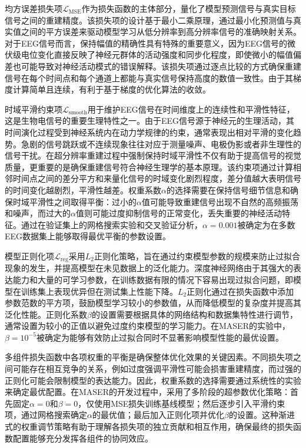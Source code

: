 均方误差损失项$\mathcal{L}_{\text{MSE}}$作为损失函数的主体部分，量化了模型预测信号与真实目标信号之间的重建精度。该损失项的设计基于最小二乘原理，通过最小化预测值与真实值之间的平方误差来驱动模型学习从低分辨率到高分辨率信号的准确映射关系。对于EEG信号而言，保持幅值的精确性具有特殊的重要意义，因为EEG信号的微伏级电位变化直接反映了神经元群体的活动强度和同步化程度，即使微小的幅值偏差也可能导致对神经活动模式的错误解释。该损失项通过逐点比较的方式确保重建信号在每个时间点和每个通道上都能与真实信号保持高度的数值一致性。由于其梯度计算简单且连续，有利于基于梯度的优化算法的收敛。

时域平滑约束项$\mathcal{L}_{\text{smooth}}$用于维护EEG信号在时间维度上的连续性和平滑性特征，这是生物电信号的重要生理特性之一。由于EEG信号源于神经元的生理活动，其时间演化过程受到神经系统内在动力学规律的约束，通常表现出相对平滑的变化趋势。急剧的信号跳跃或不连续现象往往对应于测量噪声、电极伪影或者非生理性的信号干扰。在超分辨率重建过程中强制保持时域平滑性不仅有助于提高信号的视觉质量，更重要的是确保重建信号符合神经生理学的基本原理。该约束项通过计算相邻时间点之间的差分平方和来量化信号的时域变化剧烈程度，差分值越大表明信号的时间变化越剧烈，平滑性越差。权重系数$\alpha$的选择需要在保持信号细节信息和确保时域平滑性之间取得平衡：过小的$\alpha$值可能导致重建信号出现不自然的高频振荡和噪声，而过大的$\alpha$值则可能过度抑制信号的正常变化，丢失重要的神经活动特征。通过在验证集上的网格搜索实验和交叉验证分析，$\alpha = 0.001$被确定为在多数EEG数据集上能够取得最优平衡的参数设置。

模型正则化项$\mathcal{L}_{\text{reg}}$采用$L_2$正则化策略，旨在通过约束模型参数的规模来防止过拟合现象的发生，并提高模型在未见数据上的泛化能力。深度神经网络由于其强大的表达能力和大量的可学习参数，在训练数据有限的情况下容易出现过拟合问题，即模型在训练集上表现优异但在测试集上性能下降。$L_2$正则化通过在损失函数中添加参数范数的平方项，鼓励模型学习较小的参数值，从而降低模型的复杂度并提高其泛化性能。正则化系数$\beta$的设置需要根据具体的网络结构和数据集特性进行调节，通常设置为较小的正值以避免过度约束模型的学习能力。在MASER的实验中，$\beta = 10^{-5}$被确定为能够有效防止过拟合同时不显著影响模型性能的最优设置。

多组件损失函数中各项权重的平衡是确保整体优化效果的关键因素。不同损失项之间可能存在相互竞争的关系，例如过度强调平滑性可能会损害重建精度，而过强的正则化可能会限制模型的表达能力。因此，权重系数的选择需要通过系统性的实验来确定最优配置。在MASER的开发过程中，采用了多阶段的超参数优化策略：首先固定$\alpha = 0$和$\beta = 0$，仅使用MSE损失训练基线模型；然后逐步引入平滑约束项，通过网格搜索确定$\alpha$的最优值；最后加入正则化项并优化$\beta$的设置。这种渐进式的权重调节策略有助于理解各损失项的独立贡献和相互作用，确保最终的损失函数配置能够充分发挥各组件的协同效应。


